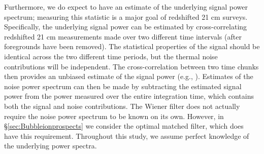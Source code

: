 Furthermore, we do expect to have an estimate of the underlying signal power
spectrum; measuring this statistic is a major goal of redshifted 21 cm surveys. Specifically, the underlying
signal power can be estimated by cross-correlating
redshifted 21 cm measurements made over 
two different time intervals (after foregrounds have been removed). The statistical
properties of the signal should be identical across the two different time
periods, but the thermal noise contributions will be independent. The
cross-correlation between two time chunks then provides an unbiased
estimate of the signal power (e.g., \citealt{Liu:2009qga}). Estimates of the noise power spectrum can then be made by
subtracting the estimated signal power from the power measured over
the entire integration time, which contains both
the signal and noise contributions. The Wiener filter does not
actually require the noise power spectrum to be known on its
own. However, in  \S\ref{sec:Bubbleionprospects} we consider the optimal
matched filter, which does have this requirement. Throughout this study, we
assume perfect knowledge of the underlying power spectra.

